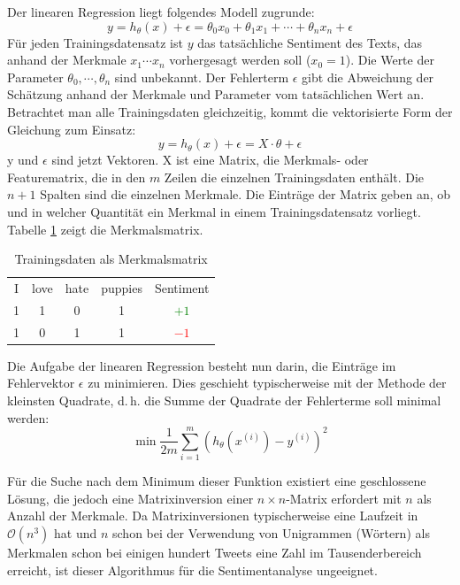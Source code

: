 Der linearen Regression liegt folgendes Modell zugrunde:
\[ y = h_{\theta} (x) + \epsilon = \theta_0 x_0 + \theta_1 x_1 + \cdots + \theta_n x_n + \epsilon \]
Für jeden Trainingsdatensatz ist \( y \) das tatsächliche Sentiment des Texts, das anhand der Merkmale \( x_1 \cdots x_n \) vorhergesagt werden soll (\( x_0 = 1 \)). Die Werte der Parameter \( \theta_0, \cdots, \theta_n \) sind unbekannt. Der Fehlerterm \( \epsilon \) gibt die Abweichung der Schätzung anhand der Merkmale und Parameter vom tatsächlichen Wert an. Betrachtet man alle Trainingsdaten gleichzeitig, kommt die vektorisierte Form der Gleichung zum Einsatz:
\[ y = h_{\theta} (x) + \epsilon = X \cdot \theta + \epsilon \]
y und \( \epsilon \) sind jetzt Vektoren. X ist eine Matrix, die Merkmals- oder Featurematrix, die in den \( m \) Zeilen die einzelnen Trainingsdaten enthält. Die \( n + 1 \) Spalten sind die einzelnen Merkmale. Die Einträge der Matrix geben an, ob und in welcher Quantität ein Merkmal in einem Trainingsdatensatz vorliegt. Tabelle \ref{sentiment:matrix} zeigt die Merkmalsmatrix.

\begin{table}
 \centering
\caption{Trainingsdaten als Merkmalsmatrix}\label{sentiment:matrix}
\begin{tabular}{cccc|c}
I & love & hate & puppies & Sentiment \\
1 & 1 & 0 & 1 & \textcolor{green}{\(+1\)} \\
1 & 0 & 1 & 1 & \textcolor{red}{\(-1\)} \\
\end{tabular}

\end{table}

Die Aufgabe der linearen Regression besteht nun darin, die Einträge im Fehlervektor \( \epsilon \) zu minimieren. Dies geschieht typischerweise mit der Methode der kleinsten Quadrate, d.\,h. die Summe der Quadrate der Fehlerterme soll minimal werden:
\[ \min \frac{1}{2m} \sum_{i=1}^{m} (h_{\theta} (x^{(i)}) - y^{(i)})^2 \]

Für die Suche nach dem Minimum dieser Funktion existiert eine geschlossene Lösung, die jedoch eine Matrixinversion einer $n\times n$-Matrix erfordert mit $n$ als Anzahl der Merkmale. Da Matrixinversionen typischerweise eine Laufzeit in \( \mathcal O(n^3) \) hat und $n$ schon bei der Verwendung von Unigrammen (Wörtern) als Merkmalen schon bei einigen hundert Tweets eine Zahl im Tausenderbereich erreicht, ist dieser Algorithmus für die Sentimentanalyse ungeeignet.

